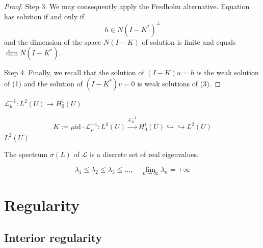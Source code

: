 \begin{theorem}
\begin{proof}
        Step 3.
        We may consequently apply the Fredholm alternative.
        Equation has solution if and only if
        \begin{equation*}
            h \in N(I-K^*)^\bot
        \end{equation*}
        and the dimension of the space $N\left(I-K\right)$ of solution is finite and equals $\dim N\left(I-K^*\right)$.

        Step 4.
        Finally, we recall that the solution of $\left(I-K\right)u=h$ is the weak solution of (1) and the solution of $\left(I-K^*\right)v=0$ is weak solutions of (3).
    \end{proof}
    \begin{remark}
        $\mathcal{L}_\mu^{-1}: L^2(U) \rightarrow H_0^1(U)$

        \begin{equation*}
            K
            :=
            \mu \mathrm{id} \cdot  \mathcal{L}_\mu ^{-1}:
            L^2(U)\xrightarrow{\mathcal{L}_\mu^{-1}} H_0^1(U)\hookrightarrow\hookrightarrow L^2 (U)
        \end{equation*}
        $L^2\left(U\right)$
    \end{remark}
\end{theorem}

\begin{theorem}
    The spectrum $\sigma(L)$ of $\mathcal{L}$ is a discrete set of real eigenvalues.
    \begin{remark}
        \begin{equation*}
            \lambda_1 \leq \lambda_2 \leq \lambda_3 \leq \ldots, \quad \lim _{n \rightarrow \infty} \lambda_n=+\infty
        \end{equation*}
    \end{remark}
\end{theorem}







\section{Regularity} %
\subsection{Interior regularity} %




